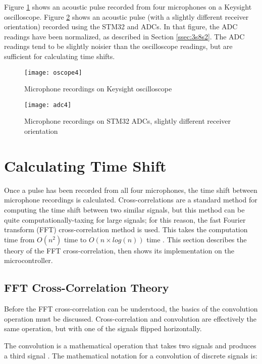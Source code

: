 \documentclass[11pt]{ucthesisCP}
\begin{document}
Figure \ref{fig:oscope4} shows an acoustic pulse recorded from four microphones on a Keysight oscilloscope. Figure \ref{fig:adc4} shows an acoustic pulse (with a slightly different receiver orientation) recorded using the STM32 and ADCs. In that figure, the ADC readings have been normalized, as described in Section \ref{ssec:3s8s2}. The ADC readings tend to be slightly noisier than the oscilloscope readings, but are sufficient for calculating time shifts.

\begin{figure}[htbp]
	\centering
	\texttt{[image: oscope4]}
	\caption{Microphone recordings on Keysight oscilloscope}
	\label{fig:oscope4}
\end{figure}

\begin{figure}[htbp]
	\centering
	\texttt{[image: adc4]}
	\caption{Microphone recordings on STM32 ADCs, slightly different receiver orientation}
	\label{fig:adc4}
\end{figure}

\section{Calculating Time Shift} \label{sec:3s8}
Once a pulse has been recorded from all four microphones, the time shift between microphone recordings is calculated. Cross-correlations are a standard method for computing the time shift between two similar signals, but this method can be quite computationally-taxing  for large signals; for this reason, the fast Fourier transform (FFT) cross-correlation method is used. This takes the computation time from \(O(n^2)\) time to \(O(n \times log(n))\) time \cite{dspguide}. This section describes the theory of the FFT cross-correlation, then shows its implementation on the microcontroller.

\subsection{FFT Cross-Correlation Theory} \label{ssec:3s8s1}
Before the FFT cross-correlation can be understood, the basics of the convolution operation must be discussed. Cross-correlation and convolution are effectively the same operation, but with one of the signals flipped horizontally.

The convolution is a mathematical operation that takes two signals and produces a third signal \cite{dspguide}. The mathematical notation for a convolution of discrete signals is:
\end{document}

